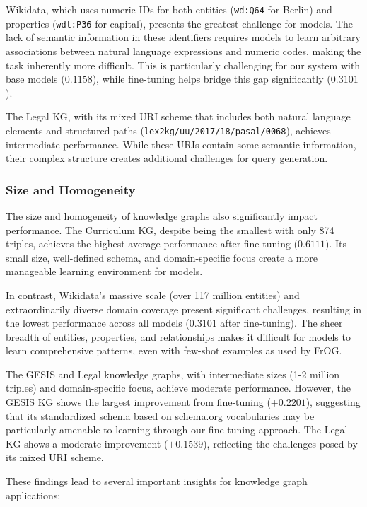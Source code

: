 Wikidata, which uses numeric IDs for both entities (\texttt{wd:Q64} for Berlin) and properties (\texttt{wdt:P36} for capital), presents the greatest challenge for models. The lack of semantic information in these identifiers requires models to learn arbitrary associations between natural language expressions and numeric codes, making the task inherently more difficult. This is particularly challenging for our system with base models ($0.1158$), while fine-tuning helps bridge this gap significantly ($0.3101$).

The Legal KG, with its mixed URI scheme that includes both natural language elements and structured paths (\texttt{lex2kg/uu/2017/18/pasal/0068}), achieves intermediate performance. While these URIs contain some semantic information, their complex structure creates additional challenges for query generation.

\subsubsection{Size and Homogeneity}
The size and homogeneity of knowledge graphs also significantly impact performance. The Curriculum KG, despite being the smallest with only 874 triples, achieves the highest average performance after fine-tuning ($0.6111$). Its small size, well-defined schema, and domain-specific focus create a more manageable learning environment for models.

In contrast, Wikidata's massive scale (over 117 million entities) and extraordinarily diverse domain coverage present significant challenges, resulting in the lowest performance across all models ($0.3101$ after fine-tuning). The sheer breadth of entities, properties, and relationships makes it difficult for models to learn comprehensive patterns, even with few-shot examples as used by FrOG.

The GESIS and Legal knowledge graphs, with intermediate sizes (1-2 million triples) and domain-specific focus, achieve moderate performance. However, the GESIS KG shows the largest improvement from fine-tuning ($+0.2201$), suggesting that its standardized schema based on schema.org vocabularies may be particularly amenable to learning through our fine-tuning approach. The Legal KG shows a moderate improvement ($+0.1539$), reflecting the challenges posed by its mixed URI scheme.

These findings lead to several important insights for knowledge graph applications:


